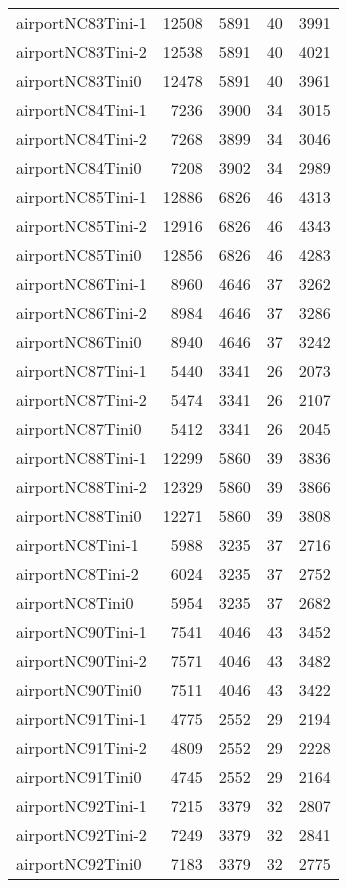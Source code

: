 \documentclass[../../../thesis.tex]{subfiles}
\begin{document}
\begin{longtable}{lrrrr}
airportNC83Tini-1 & 12508 & 5891 & 40 & 3991 \\
airportNC83Tini-2 & 12538 & 5891 & 40 & 4021 \\
airportNC83Tini0 & 12478 & 5891 & 40 & 3961 \\
airportNC84Tini-1 & 7236 & 3900 & 34 & 3015 \\
airportNC84Tini-2 & 7268 & 3899 & 34 & 3046 \\
airportNC84Tini0 & 7208 & 3902 & 34 & 2989 \\
airportNC85Tini-1 & 12886 & 6826 & 46 & 4313 \\
airportNC85Tini-2 & 12916 & 6826 & 46 & 4343 \\
airportNC85Tini0 & 12856 & 6826 & 46 & 4283 \\
airportNC86Tini-1 & 8960 & 4646 & 37 & 3262 \\
airportNC86Tini-2 & 8984 & 4646 & 37 & 3286 \\
airportNC86Tini0 & 8940 & 4646 & 37 & 3242 \\
airportNC87Tini-1 & 5440 & 3341 & 26 & 2073 \\
airportNC87Tini-2 & 5474 & 3341 & 26 & 2107 \\
airportNC87Tini0 & 5412 & 3341 & 26 & 2045 \\
airportNC88Tini-1 & 12299 & 5860 & 39 & 3836 \\
airportNC88Tini-2 & 12329 & 5860 & 39 & 3866 \\
airportNC88Tini0 & 12271 & 5860 & 39 & 3808 \\
airportNC8Tini-1 & 5988 & 3235 & 37 & 2716 \\
airportNC8Tini-2 & 6024 & 3235 & 37 & 2752 \\
airportNC8Tini0 & 5954 & 3235 & 37 & 2682 \\
airportNC90Tini-1 & 7541 & 4046 & 43 & 3452 \\
airportNC90Tini-2 & 7571 & 4046 & 43 & 3482 \\
airportNC90Tini0 & 7511 & 4046 & 43 & 3422 \\
airportNC91Tini-1 & 4775 & 2552 & 29 & 2194 \\
airportNC91Tini-2 & 4809 & 2552 & 29 & 2228 \\
airportNC91Tini0 & 4745 & 2552 & 29 & 2164 \\
airportNC92Tini-1 & 7215 & 3379 & 32 & 2807 \\
airportNC92Tini-2 & 7249 & 3379 & 32 & 2841 \\
airportNC92Tini0 & 7183 & 3379 & 32 & 2775 \\

\end{longtable}
\end{document}
